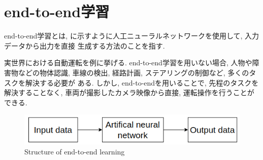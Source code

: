 
\section{end-to-end学習}
end-to-end学習とは, に示すように人工ニューラルネットワークを使用して, 入力データから出力を直接
生成する方法のことを指す. \par 実世界における自動運転を例に挙げる. end-to-end学習を用いない場合, 人物や障害物などの物体認識, 車線の検出, 経路計画, ステアリングの制御など, 多くのタスクを解決する必要が
ある. しかし, end-to-endを用いることで, 先程のタスクを解決することなく, 車両が撮影したカメラ映像から直接, 運転操作を行うことができる. 
\vspace{5cm}

\begin{figure}[hbtp]
  \centering
 \includegraphics[keepaspectratio, scale=0.7]
      {images/end-to-end.png}
 \caption{Structure of end-to-end learning}
 \label{Fig:end-to-end}
\end{figure}

\newpage
